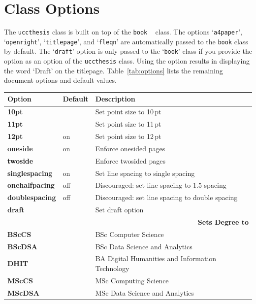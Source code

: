 \documentclass[MScDSA]{uccthesis}
\begin{document}
   \section{Class Options}
      The \texttt{uccthesis}
       class is built on top of the \texttt{book}%
       ~\parencite{Lamport:94} class.
      The options
       `\texttt{a4paper}',
       `\texttt{openright}',
       `\texttt{titlepage}', and
       `\texttt{fleqn}'
       are automatically passed to the \texttt{book} class by default.
      The `\texttt{draft}' option is only passed to
       the `\texttt{book}' class if you provide the option
       as an option of the \texttt{uccthesis} class.
      Using the option
       results in displaying the word `Draft' on the titlepage.
      Table~\ref{tab:options} lists the remaining document options
       and default values.
      \begin{table}[tbp]
      \begin{tabular}{lll}
        \toprule
        \textbf{Option}   & \textbf{Default} & \textbf{Description}
      \\\midrule
        \textbf{10pt}     &     & Set point size to 10\,pt
      \\\textbf{11pt}     &     & Set point size to 11\,pt
      \\\textbf{12pt}     & on  & Set point size to 12\,pt
      \\\textbf{oneside}  & on  & Enforce onesided pages
      \\\textbf{twoside}  &     & Enforce twosided pages
      \\\textbf{singlespacing} & on & Set line spacing to single spacing
      \\\textbf{onehalfpacing} & off & Discouraged: set line spacing to $1.5$ spacing
      \\\textbf{doublespacing} & off & Discouraged: set line spacing to double spacing
      \\\textbf{draft}    &     & Set draft option
      \\\midrule
        \multicolumn{3}{r}{\textbf{Sets Degree to}}
      \\\midrule
        \textbf{BScCS}    &     & BSc Computer Science
      \\\textbf{BScDSA}   &     & BSc Data Science and Analytics
      \\\textbf{DHIT}     &     & BA Digital Humanities and Information Technology
      \\\textbf{MScCS}    &     & MSc Computing Science
      \\\textbf{MScDSA}   &     & MSc Data Science and Analytics

\end{tabular}
\end{table}
\end{document}
